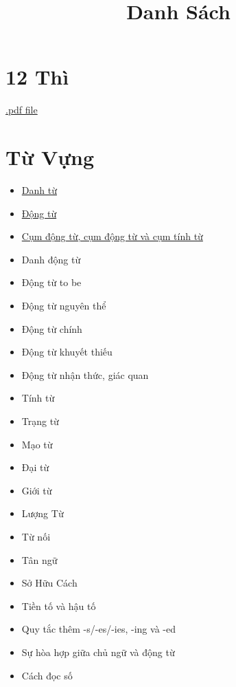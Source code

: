 \title{\Huge \textbf{Danh Sách}}
\maketitle
\tableofcontents

\chapter{12 Thì}
\href{https://github.com/theslime016/english-project/blob/main/english-project-release-files/12Tenses.pdf}
{.pdf file}
\chapter{Từ Vựng}
\begin{multicols*}{2}
    \begin{itemize}
        \item \href{https://github.com/theslime016/english-project/blob/main/english-project-release-files/Noun.pdf}{Danh từ}
        \item \href{https://github.com/theslime016/english-project/blob/main/english-project-release-files/Verb.pdf}{Động từ}
        \item \href{https://github.com/theslime016/english-project/blob/main/english-project-release-files/Phrasal.pdf}{Cụm động từ, cụm động từ và cụm tính từ}
        \item Danh động từ
        \item Động từ to be
        \item Động từ nguyên thể
        \item Động từ chính
        \item Động từ khuyết thiếu
        \item Động từ nhận thức, giác quan
        \item Tính từ
        \item Trạng từ
        \item Mạo từ
        \item Đại từ
        \item Giới từ
        \item Lượng Từ
        \item Từ nối
        \item Tân ngữ
        \item Sở Hữu Cách
        \item Tiền tố và hậu tố
        \item Quy tắc thêm -s/-es/-ies, -ing và -ed
        \item Sự hòa hợp giữa chủ ngữ và động từ
        \item Cách đọc số
    \end{itemize}
\end{multicols*}

